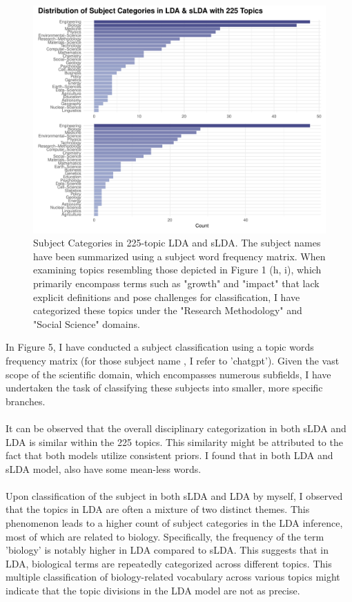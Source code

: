 \documentclass[12pt,twoside]{article}
\begin{document}
\begin{figure}[h]
    \centering
    \includegraphics[width=15cm]{./figures/subject225}
    \caption{Subject Categories in 225-topic LDA and sLDA. The subject names have been summarized using a subject word frequency matrix. When examining topics resembling those depicted in Figure 1 (h, i), which primarily encompass terms such as "growth" and "impact" that lack explicit definitions and pose challenges for classification, I have categorized these topics under the "Research Methodology" and "Social Science" domains. }
\end{figure}

In Figure 5, I have conducted a subject classification using a topic words frequency matrix (for those subject name , I refer to 'chatgpt'). Given the vast scope of the scientific domain, which encompasses numerous subfields, I have undertaken the task of classifying these subjects into smaller, more specific branches.\\\\

It can be observed that the overall disciplinary categorization in both sLDA and LDA is similar within the 225 topics. This similarity might be attributed to the fact that both models utilize consistent priors. I found that in both LDA and sLDA model, also have some mean-less words. \\\\

Upon classification of the subject in both sLDA and LDA by myself, I observed that the topics in LDA are often a mixture of two distinct themes. This phenomenon leads to a higher count of subject categories in the LDA inference, most of which are related to biology. Specifically, the frequency of the term 'biology' is notably higher in LDA compared to sLDA. This suggests that in LDA, biological terms are repeatedly categorized across different topics. This multiple classification of biology-related vocabulary across various topics might indicate that the topic divisions in the LDA model are not as precise.\\\\
\end{document}
